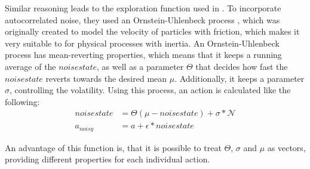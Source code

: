 Similar reasoning leads to the exploration function used in \cite{lillicrap_continuous_2015}. To incorporate autocorrelated noise, they used an Ornstein-Uhlenbeck process \cite{uhlenbeck_theory_1930}, which was originally created to model the velocity of particles with friction, which makes it very suitable to for physical processes with inertia. An Ornstein-Uhlenbeck process has mean-reverting properties, which means that it keeps a running average of the $noisestate$, as well as a parameter $\Theta$ that decides how fast the $noisestate$ reverts towards the desired mean $\mu$. Additionally, it keeps a parameter $\sigma$, controlling the volatility. Using this process, an action is calculated like the following:
\begin{align*}
	noisestate &= \Theta (\mu - noisestate) + \sigma * \mathcal{N}\\
	a_{noisy}  &= a + \epsilon * noisestate
\end{align*}

An advantage of this function is, that it is possible to treat $\Theta$, $\sigma$ and $\mu$ as vectors, providing different properties for each individual action.
 
 
